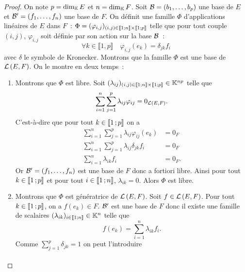 \begin{proof}
  On note \(p=\operatorname{dim}_{\mathbb{K}} E\) et \(n=\operatorname{dim}_{\mathbb{K}} F\). Soit \(\mathcal{B}=(b_1, \ldots, b_p)\) une
  base de \(E\) et \(\mathcal{B}'=(f_1, \ldots, f_n)\) une base de \(F\). On définit une
  famille \(\Phi\) d'applications linéaires de \(E\) dans \(F\)~: \(\Phi =
  (\varphi_{i,j})_{(i,j) \in \mathopen{\llbracket}1\mathclose{}\mathpunct{};n\mathclose{\rrbracket} \times
  \mathopen{\llbracket}1\mathclose{}\mathpunct{};p\mathclose{\rrbracket}}\) telle que pour tout couple \((i,j)\),
  \(\varphi_{i,j}\) soit définie par son action sur la base \(\mathcal{B}\)~:
  \begin{equation}
    \forall k \in \llbracket 1,p \rrbracket \quad \varphi_{i,j}(e_k)=
    \delta_{jk} f_i
  \end{equation}
  avec \(\delta\) le symbole de Kronecker. Montrons que la famille \(\Phi\) est
  une base de \(\mathcal{L}\left(E,F\right)\). On le montre en deux temps~:
  \begin{enumerate}
    \item Montrons que \(\Phi\) est libre. Soit \((\lambda_{ij})_{(i,j) \in
      \mathopen{\llbracket}1\mathclose{}\mathpunct{};n\mathclose{\rrbracket} \times \mathopen{\llbracket}1\mathclose{}\mathpunct{};p\mathclose{\rrbracket}} \in \mathbb{K}^{np}\)
      telle que
      \begin{equation}
        \sum_{i=1}^n \sum_{j=1}^p \lambda_{ij} \varphi_{ij} =0_{\mathcal{L}\left(E,F\right)}.
      \end{equation}
      C'est-à-dire que pour tout \(k \in \mathopen{\llbracket}1\mathclose{}\mathpunct{};p\mathclose{\rrbracket}\) on a
      \begin{align}
        \sum_{i=1}^n \sum_{j=1}^p \lambda_{ij} \varphi_{ij}(e_k) &=0_F\\
        \sum_{i=1}^n \sum_{j=1}^p \lambda_{ij} \delta_{jk} f_i &=0_F\\
        \sum_{i=1}^n \lambda_{ik} f_i &=0_F.
      \end{align}
      Or \(\mathcal{B}'=(f_1, \ldots, f_n)\) est une base de \(F\) donc a fortiori libre.
      Ainsi pour tout \(k \in \mathopen{\llbracket}1\mathclose{}\mathpunct{};p\mathclose{\rrbracket}\) et pour tout \(i \in
      \mathopen{\llbracket}1\mathclose{}\mathpunct{};n\mathclose{\rrbracket}\), \(\lambda_{ik}=0\). Alors \(\Phi\) est libre.
    \item  Montrons que \(\Phi\) est génératrice de \(\mathcal{L}\left(E,F\right)\). Soit \(f \in
      \mathcal{L}\left(E,F\right)\). Pour tout \(k \in \mathopen{\llbracket}1\mathclose{}\mathpunct{};p\mathclose{\rrbracket}\), on a \(f(e_k)
      \in F\). \(\mathcal{B}'\) est une base de \(F\) donc il existe une famille de
      scalaires \((\lambda_{ik})_{i \in  \mathopen{\llbracket}1\mathclose{}\mathpunct{};n\mathclose{\rrbracket}} \in \mathbb{K}^n\)
      telle que
      \begin{equation}
        f(e_k)= \sum_{i=1}^n \lambda_{ik} f_i.
      \end{equation}
      Comme \(\sum_{j=1}^p \delta_{jk}=1\) on peut l'introduire
      \begin{align}

\end{align}
\end{enumerate}
\end{proof}
